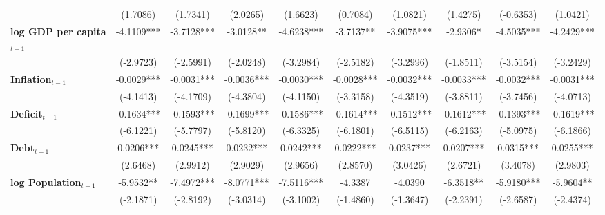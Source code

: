 \begin{center}
\begin{tabular}{lccccccccc}
\textbf{ }                         &    (1.7086)    &     (1.7341)     &     (2.0265)     &     (1.6623)     &     (0.7084)     &     (1.0821)     &     (1.4275)     &    (-0.6353)     &     (1.0421)      \\
\textbf{log GDP per capita$_{t-1}$}           &   -4.1109***   &    -3.7128***    &    -3.0128**     &    -4.6238***    &    -3.7137**     &    -3.9075***    &     -2.9306*     &    -4.5035***    &    -4.2429***     \\
\textbf{ }                         &   (-2.9723)    &    (-2.5991)     &    (-2.0248)     &    (-3.2984)     &    (-2.5182)     &    (-3.2996)     &    (-1.8511)     &    (-3.5154)     &    (-3.2429)      \\
\textbf{Inflation$_{t-1}$}      &   -0.0029***   &    -0.0031***    &    -0.0036***    &    -0.0030***    &    -0.0028***    &    -0.0032***    &    -0.0033***    &    -0.0032***    &    -0.0031***     \\
\textbf{ }                         &   (-4.1413)    &    (-4.1709)     &    (-4.3804)     &    (-4.1150)     &    (-3.3158)     &    (-4.3519)     &    (-3.8811)     &    (-3.7456)     &    (-4.0713)      \\
\textbf{Deficit$_{t-1}$}             &   -0.1634***   &    -0.1593***    &    -0.1699***    &    -0.1586***    &    -0.1614***    &    -0.1512***    &    -0.1612***    &    -0.1393***    &    -0.1619***     \\
\textbf{ }                         &   (-6.1221)    &    (-5.7797)     &    (-5.8120)     &    (-6.3325)     &    (-6.1801)     &    (-6.5115)     &    (-6.2163)     &    (-5.0975)     &    (-6.1866)      \\
\textbf{Debt$_{t-1}$}                &   0.0206***    &    0.0245***     &    0.0232***     &    0.0242***     &    0.0222***     &    0.0237***     &    0.0207***     &    0.0315***     &    0.0255***      \\
\textbf{ }                         &    (2.6468)    &     (2.9912)     &     (2.9029)     &     (2.9656)     &     (2.8570)     &     (3.0426)     &     (2.6721)     &     (3.4078)     &     (2.9803)      \\
\textbf{log Population$_{t-1}$}      &   -5.9532**    &    -7.4972***    &    -8.0771***    &    -7.5116***    &     -4.3387      &     -4.0390      &    -6.3518**     &    -5.9180***    &    -5.9604**      \\
\textbf{ }                         &   (-2.1871)    &    (-2.8192)     &    (-3.0314)     &    (-3.1002)     &    (-1.4860)     &    (-1.3647)     &    (-2.2391)     &    (-2.6587)     &    (-2.4374)      \\

\end{tabular}
\end{center}
